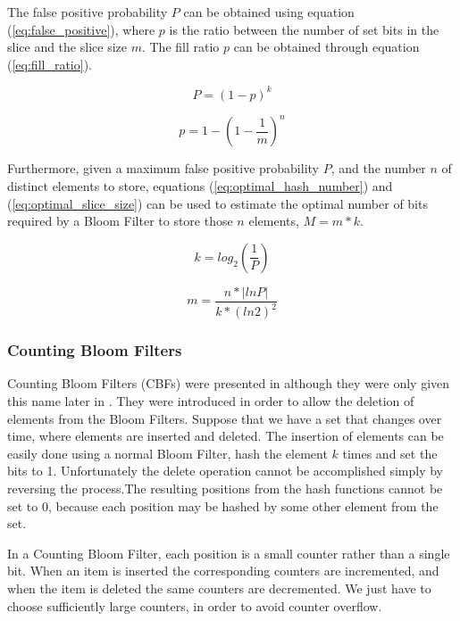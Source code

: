 The false positive probability $P$
can be obtained using equation (\ref{eq:false_positive}), where $p$ is
the ratio between the number of set bits in the slice and the slice
size $m$. The fill ratio $p$ can be obtained through equation
(\ref{eq:fill_ratio}).

\begin{equation}
  \label{eq:false_positive}
  P = (1-p)^k
\end{equation}

\begin{equation}
  \label{eq:fill_ratio}
  p = 1-\left(1-\frac{1}{m}\right)^n
\end{equation}

Furthermore, given a maximum false positive probability $P$, and the
number $n$ of distinct elements to store, equations
(\ref{eq:optimal_hash_number}) and (\ref{eq:optimal_slice_size}) can
be used to estimate the optimal number of bits required by a Bloom
Filter to store those $n$ elements, $M=m*k$.

\begin{equation}
  \label{eq:optimal_hash_number}
  k = log_2\left(\frac{1}{P}\right)
\end{equation}

\begin{equation}
  \label{eq:optimal_slice_size}
  m = \frac{n*|lnP|}{k*(ln2)^2}
\end{equation}

\subsubsection{Counting Bloom Filters}
\label{sec:count-bloom-filt}

Counting Bloom Filters (CBFs) were presented in
\cite{Fan98summarycache:} although they were only given this name
later in \cite{Mitzenmacher:2002:CBF:581876.581878}. They were
introduced in order to allow the deletion of elements from the Bloom
Filters. Suppose that we have a set that changes over time, where
elements are inserted and deleted. The insertion of elements can be
easily done using a normal Bloom Filter, hash the element $k$ times
and set the bits to 1. Unfortunately the delete operation cannot be
accomplished simply by reversing the process.The resulting positions
from the hash functions cannot be set to 0, because each position may
be hashed by some other element from the set.

In a Counting Bloom Filter, each position is a small counter rather
than a single bit. When an item is inserted the corresponding counters
are incremented, and when the item is deleted the same counters are
decremented. We just have to choose sufficiently large counters, in
order to avoid counter overflow.

